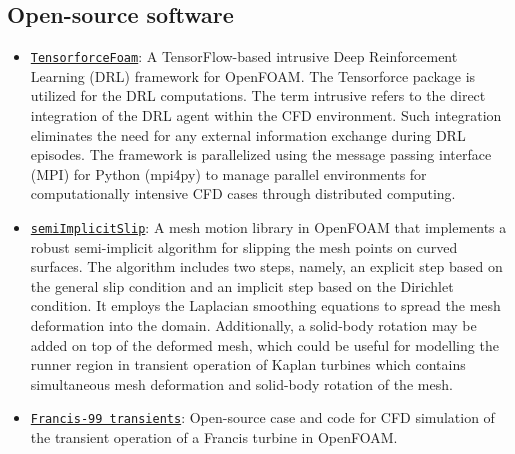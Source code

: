 \begin{longtable}[l]{>{\raggedleft\arraybackslash}p{}|p{}}
    
\end{longtable}


\subsection{Open-source software}

\begin{itemize}[]
    \item \href{https://github.com/salehisaeed/TensorforceFoam}{\texttt{TensorforceFoam}}: A TensorFlow-based intrusive Deep Reinforcement Learning (DRL) framework for OpenFOAM. The Tensorforce package is utilized for the DRL computations. The term intrusive refers to the direct integration of the DRL agent within the CFD environment. Such integration eliminates the need for any external information exchange during DRL episodes. The framework is parallelized using the message passing interface (MPI) for Python (mpi4py) to manage parallel environments for computationally intensive CFD cases through distributed computing.


    \item \href{https://github.com/salehisaeed/semiImplicitSlip}{\texttt{semiImplicitSlip}}: A mesh motion library in OpenFOAM that implements a robust semi-implicit algorithm for slipping the mesh points on curved surfaces. The algorithm includes two steps, namely, an explicit step based on the general slip condition and an implicit step based on the Dirichlet condition. It employs the Laplacian smoothing equations to spread the mesh deformation into the domain. Additionally, a solid-body rotation may be added on top of the deformed mesh, which could be useful for modelling the runner region in transient operation of Kaplan turbines which contains simultaneous mesh deformation and solid-body rotation of the mesh.
    
    \item \href{https://dataverse.harvard.edu/dataset.xhtml?persistentId=doi:10.7910/DVN/31JGOM}{\texttt{Francis-99 transients}}: Open-source case and code for CFD simulation of the transient operation of a Francis turbine in OpenFOAM.
\end{itemize}

